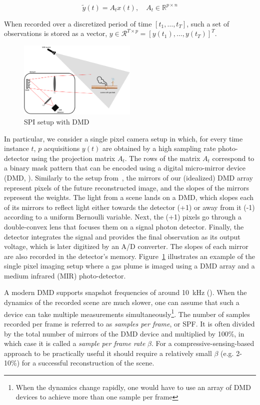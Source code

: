 \begin{equation}
    \label{eq:cs_definition}
    \tilde{y}(t) = A_t x(t), \quad A_t \in \mathbb{R}^{p\times n}
\end{equation}

When recorded over a discretized period of time $[t_1, \dots, t_T]$, such a set of observations is stored as a vector, $y \in \mathcal{R}^{T \times p} = [y(t_1), \dots, y(t_T)]^T$.

\begin{figure}
\centering
\includegraphics[width = 0.5\textwidth]{figures/SPI_setup.pdf}
\caption{SPI setup with DMD \label{fig:SPI}}
\end{figure}

In particular, we consider a single pixel camera setup in which, for every time instance $t$, $p$ acquisitions $y(t)$ are obtained by a high sampling rate photo-detector using the projection matrix $A_t$. The rows of the matrix $A_t$ correspond to a binary mask pattern that can be encoded using a digital micro-mirror device (DMD, \cite{pittman1995optical, sampsell1993overview}). Similarly to the setup from~\cite{duarte2008single}, the mirrors of our (idealized) DMD array represent pixels of the future reconstructed image, and the slopes of the mirrors represent the weights. The light from a scene lands on a DMD, which slopes each of its mirrors to reflect light either towards the detector (+1) or away from it (-1) according to a uniform Bernoulli variable. Next, the (+1) pixels go through a double-convex lens that focuses them on a signal photon detector. Finally, the detector integrates the signal and provides the final observation as its output voltage, which is later digitized by an A/D converter. The slopes of each mirror are also recorded in the detector's memory. Figure~\ref{fig:SPI} illustrates an example of the single pixel imaging setup where a gas plume is imaged using a DMD array and a medium infrared (MIR) photo-detector. 

A modern DMD supports snapshot frequencies of around 10~kHz (\cite{wang2022single}). When the dynamics of the recorded scene are much slower, one can assume that such a device can take multiple measurements simultaneously\footnote{When the dynamics change rapidly, one would have to use an array of DMD devices to achieve more than one sample per frame}. The number of samples recorded per  frame is referred to as \textit{samples per frame}, or SPF. It is often divided by the total number of mirrors of the DMD device and multiplied by 100\%, in which case it is called a \textit{sample per frame rate} $\beta$. For a compressive-sensing-based approach to be practically useful it should require a relatively small $\beta$ (e.g. 2-10\%) for a successful reconstruction  of the scene.

